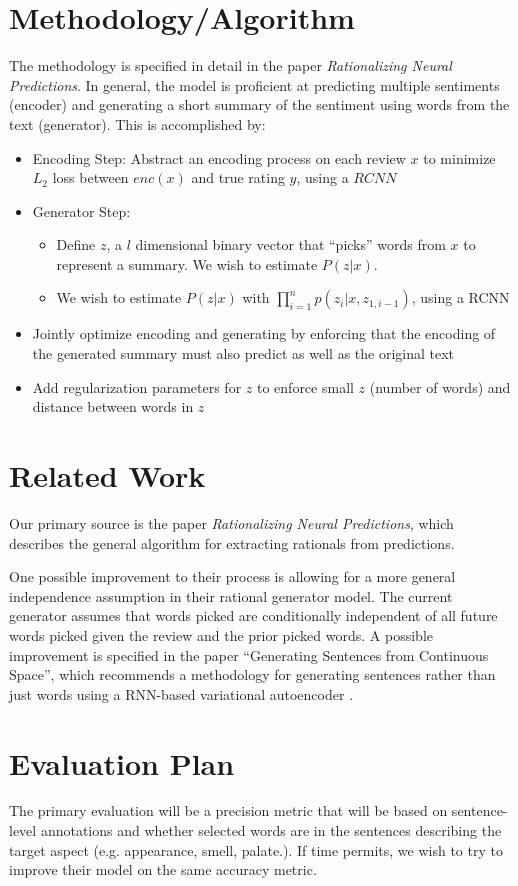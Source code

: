 \documentclass{article}
\begin{document}
\section*{Methodology/Algorithm}

The methodology is specified in detail in the paper \textit{Rationalizing Neural
Predictions}. In general, the model is proficient at predicting multiple
sentiments (encoder) and generating a short summary of the sentiment using words
from the text (generator). This is accomplished by:

\begin{itemize}
\item Encoding Step: Abstract an encoding process on each review $x$ to minimize $L_{2}$ loss between $enc(x)$ and true rating $y$, using a $RCNN$
    \item Generator Step: 
    \begin{itemize}
\item Define $z$, a $l$ dimensional binary vector that ``picks'' words from $x$ to represent a summary. We wish to estimate $P(z | x)$. 
\item We wish to estimate $P(z | x)$ with $\prod_{i = 1}^{n} p(z_{i} | x, z_{1, i - 1})$, using a RCNN
\end{itemize}
\item Jointly optimize encoding and generating by enforcing that the 
encoding of the generated summary must also predict as well as the original 
text
\item Add regularization parameters for $z$ to enforce small $z$ (number of words) and distance between words in $z$
\end{itemize}

\section*{Related Work}

Our primary source is the paper \textit{Rationalizing Neural Predictions}, which
describes the general algorithm for extracting rationals from predictions.

One possible improvement to their process is allowing for a more general
independence assumption in their rational generator model. The current generator
assumes that words picked are conditionally independent of all future words
picked given the review and the prior picked words. A possible improvement is
specified in the paper ``Generating Sentences from Continuous Space'', which
recommends a methodology for generating sentences rather than just words using a
RNN-based variational autoencoder \cite{Bowman}.

\section*{Evaluation Plan}

The primary evaluation will be a precision metric that will be based on
sentence-level annotations and whether selected words are in the sentences
describing the target aspect (e.g. appearance, smell, palate.). If time permits,
we wish to try to improve their model on the same accuracy metric.

{\small


}
\end{document}
